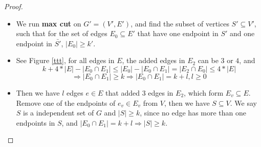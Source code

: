 \documentclass{article}
\newcommand{\<}{
    \langle}
\renewcommand{\>}{
    \rangle}
\begin{document}
{\begin{proof}
\begin{itemize}
        \item We run \textbf{max cut} on $G'=(V',E')$, and find the subset of vertices $S'\subseteq V'$, such that for the set of edges $E_0\subseteq E'$ that have one endpoint in $S'$ and one endpoint in $\bar{S'}$, $|E_0|\geq k'$.
        \item See Figure \ref{ttt}, for all edges in $E$, the added edges in $E_2$ can be $3$ or $4$, and
        \begin{displaymath}
            k+4*|E|-|E_0\cap E_1| \leq|E_0|-|E_0\cap E_1|=|E_2\cap E_0|\leq4*|E|
        \end{displaymath}
        \begin{displaymath}
            \Rightarrow |E_0\cap E_1|\geq k \Rightarrow |E_0\cap E_1|=k+l,l\geq 0 
        \end{displaymath}
        \item Then we have $l$ edges $e\in E$ that added $3$ edges in $E_2$, which form $E_v\subseteq E$. Remove one of the endpoints of $e_v\in E_v$ from $V$, then we have $S\subseteq V$. We say $S$ is a independent set of $G$ and $|S|\geq k$, since no edge has more than one endpoints in $S$, and $|E_0\cap E_1|=k+l\Rightarrow |S|\geq k$.
        \end{itemize}
\end{proof}

\newpage


}
\end{document}
